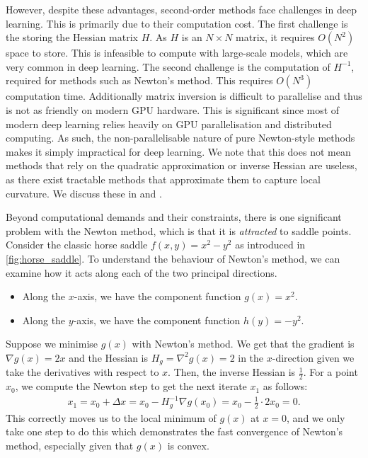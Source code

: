 However, despite these advantages, second-order methods face challenges in deep learning. This is primarily due to their computation cost. The first challenge is the storing the Hessian matrix $H$. As $H$ is an $N \times N$ matrix, it requires $O(N^2)$ space to store. This is infeasible to compute with large-scale models, which are very common in deep learning. The second challenge is the computation of $H^{-1}$, required for methods such as Newton's method. This requires $O(N^3)$ computation time. Additionally matrix inversion is difficult to parallelise and thus is not as friendly on modern GPU hardware. This is significant since most of modern deep learning relies heavily on GPU parallelisation and distributed computing. As such, the non-parallelisable nature of pure Newton-style methods makes it simply impractical for deep learning. We note that this does not mean methods that rely on the quadratic approximation or inverse Hessian are useless, as there exist tractable methods that approximate them to capture local curvature. We discuss these in  and .

Beyond computational demands and their constraints, there is one significant problem with the Newton method, which is that it is \textit{attracted} to saddle points. Consider the classic horse saddle $f(x, y) = x^2 - y^2$ as introduced in \cref{fig:horse_saddle}. To understand the behaviour of Newton's method, we can examine how it acts along each of the two principal directions. 
\begin{itemize}
    \item Along the $x$-axis, we have the component function $g(x) = x^2$. 
    \item Along the $y$-axis, we have the component function $h(y) = -y^2$.
\end{itemize}
Suppose we minimise $g(x)$ with Newton's method. We get that the gradient is $\nabla g(x) = 2x$ and the Hessian is $H_g = \nabla^2 g(x) = 2$ in the $x$-direction given we take the derivatives with respect to $x$. Then, the inverse Hessian is $\frac{1}{2}$. For a point $x_0$, we compute the Newton step to get the next iterate $x_1$ as follows:
\begin{align}
    x_1 = x_0 + \Delta x = x_0 - H_g^{-1} \nabla g(x_0) = x_0 - \frac{1}{2} \cdot 2 x_0 = 0.
\end{align}
This correctly moves us to the local minimum of $g(x)$ at $x = 0$, and we only take one step to do this which demonstrates the fast convergence of Newton's method, especially given that $g(x)$ is convex. 

